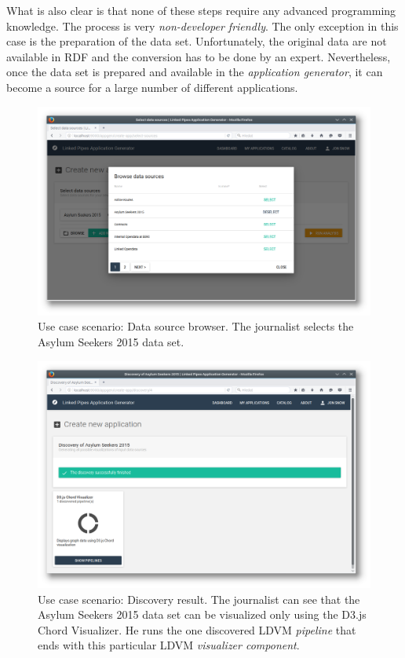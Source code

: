 What is also clear is that none of these steps require any advanced programming knowledge. The process is very \emph{non-developer friendly}. The only exception in this case is the preparation of the data set. Unfortunately, the original data are not available in RDF and the conversion has to be done by an expert. Nevertheless, once the data set is prepared and available in the \emph{application generator}, it can become a source for a large number of different applications.

\begin{figure}
	\centering
	\includegraphics[width=145mm]{img/05_scenario_01_browse_data_sources.png}
	\caption{Use case scenario: Data source browser. The journalist selects the Asylum Seekers 2015 data set.}
	\label{fig:scenario-01-browse-data-sources}
\end{figure}

\begin{figure}
	\centering
	\includegraphics[width=145mm]{img/05_scenario_02_discovery_result.png}
	\caption{Use case scenario: Discovery result. The journalist can see that the Asylum Seekers 2015 data set can be visualized only using the D3.js Chord Visualizer. He runs the one discovered LDVM \emph{pipeline} that ends with this particular LDVM \emph{visualizer component}.}
	\label{fig:scenario-02-discovery-result}
\end{figure}

